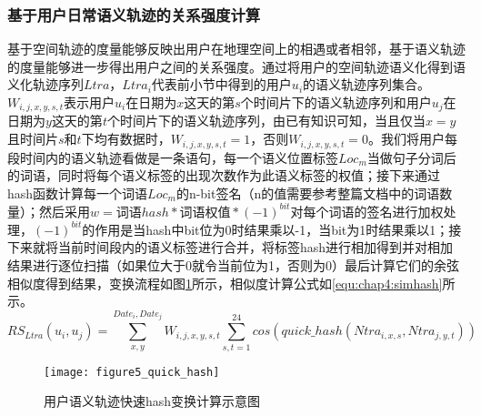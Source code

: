 \subsubsection{基于用户日常语义轨迹的关系强度计算}
基于空间轨迹的度量能够反映出用户在地理空间上的相遇或者相邻，基于语义轨迹的度量能够进一步得出用户之间的关系强度。通过将用户的空间轨迹语义化得到语义化轨迹序列$Ltra$，$Ltra_{i}$代表前小节中得到的用户$u_{i}$的语义轨迹序列集合。$W_{i,j,x,y,s,t}$表示用户$u_{i}$在日期为$x$这天的第$s$个时间片下的语义轨迹序列和用户$u_{j}$在日期为$y$这天的第$t$个时间片下的语义轨迹序列，由已有知识可知，当且仅当$x=y$且时间片$s$和$t$下均有数据时，$W_{i,j,x,y,s,t}=1$，否则$W_{i,j,x,y,s,t}=0$。我们将用户每段时间内的语义轨迹看做是一条语句，每一个语义位置标签$Loc_{m}$当做句子分词后的词语，同时将每个语义标签的出现次数作为此语义标签的权值；接下来通过hash函数计算每一个词语$Loc_{m}$的n-bit签名（n的值需要参考整篇文档中的词语数量）；然后采用$w=词语hash*词语权值*(-1)^{bit}$对每个词语的签名进行加权处理，$(-1)^{bit}$的作用是当hash中bit位为0时结果乘以-1，当bit为1时结果乘以1；接下来就将当前时间段内的语义标签进行合并，将标签hash进行相加得到并对相加结果进行逐位扫描（如果位大于0就令当前位为1，否则为0）最后计算它们的余弦相似度得到结果，变换流程如图\ref{fig:quick_hash}所示，相似度计算公式如\ref{equ:chap4:simhash}所示。
\begin{equation}
\label{equ:chap4:simhash}
RS_{Ltra}(u_{i},u_{j})=\sum_{x ,y }^{ Date_{i}, Date_{j}}W_{i,j,x,y,s,t}\sum_{s,t=1}^{24} cos(quick\_hash(Ntra_{i,x,s},Ntra_{j,y,t}))
\end{equation}
\begin{figure}[htb]
\centering
\texttt{[image: figure5\_quick\_hash]}
\caption{用户语义轨迹快速hash变换计算示意图}
\label{fig:quick_hash}
\end{figure}
